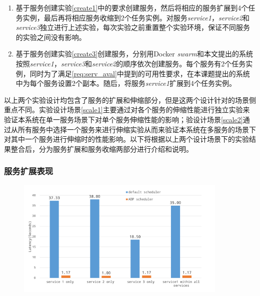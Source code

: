 \begin{enumerate}
\item\label{scale1} 基于服务创建实验\ref{create1}中的要求创建服务，然后将相应的服务扩展到4个任务实例，最后再将相应服务收缩到2个任务实例。对服务\emph{service1}，\emph{service2}和\emph{service3}独立进行上述实验，每次实验之前重置整个实验环境，保证不同服务的实验之间没有影响。
\item\label{scale2} 基于服务创建实验\ref{create3}创建服务，分别用Docker \emph{swarm}和本文提出的系统按照\emph{service1}，\emph{service3}和\emph{service2}的顺序依次创建服务。每个服务有2个任务实例，同时为了满足\ref{req:serv_aval}中提到的可用性要求，在本课题提出的系统中为每个服务设置2个副本。随后，将服务\emph{service1}扩展到4个任务实例。
\end{enumerate}

以上两个实验设计均包含了服务的扩展和伸缩部分，但是这两个设计针对的场景侧重点不同。实验设计场景\ref{scale1}主要通过对各个服务的伸缩性能进行独立实验来验证本系统在单一服务场景下对单个服务伸缩性能的影响；验设计场景\ref{scale2}通过从所有服务中选择一个服务来进行伸缩实验从而来验证本系统在多服务的场景下对其中一个服务进行伸缩时的性能影响。以下将根据以上两个设计场景下的实验结果整合后，分为服务扩展和服务收缩两部分进行介绍和说明。

\subsubsection{服务扩展表现}\label{sec:scaleout}

\begin{figure}[htbp]
\centering
\includegraphics[width=0.9\textwidth]{./figure/scaleout}
\end{figure}

